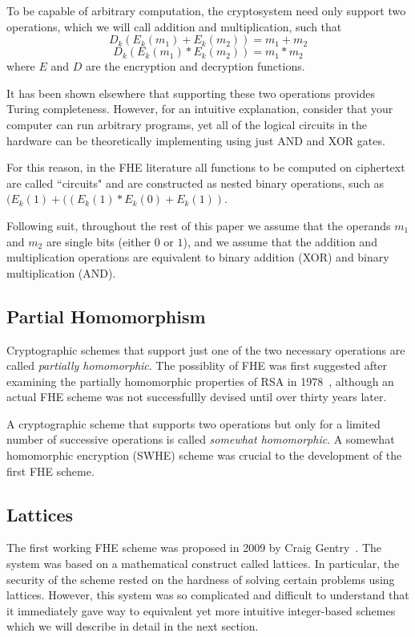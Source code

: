 \documentclass[letterpaper,twocolumn,10pt]{article}
\begin{document}
To be capable of arbitrary computation, the cryptosystem need only support two operations, which we will call addition and multiplication, such that
$$D_k(E_k(m_1) + E_k(m_2)) = m_1 + m_2$$
$$D_k(E_k(m_1) * E_k(m_2)) = m_1 * m_2$$
where $E$ and $D$ are the encryption and decryption functions.

It has been shown elsewhere that supporting these two operations provides Turing completeness. However, for an intuitive explanation, consider that your computer can run arbitrary programs, yet all of the logical circuits in the hardware can be theoretically implementing using just AND and XOR gates. 

For this reason, in the FHE literature all functions to be computed on ciphertext are called ``circuits" and are constructed as nested binary operations, such as $(E_k(1)+((E_k(1)*E_k(0)+E_k(1))$.

Following suit, throughout the rest of this paper we assume that the operands $m_1$ and $m_2$ are single bits (either $0$ or $1$), and we assume that the addition and multiplication operations are equivalent to binary addition (XOR) and binary multiplication (AND).

\subsection{Partial Homomorphism}
Cryptographic schemes that support just one of the two necessary operations are called \emph{partially homomorphic}. The possiblity of FHE was first suggested after examining the partially homomorphic properties of RSA in 1978~\cite{Rivest}, although an actual FHE scheme was not successfullly devised until over thirty years later.

A cryptographic scheme that supports two operations but only for a limited number of successive operations is called \emph{somewhat homomorphic}. A somewhat homomorphic encryption (SWHE) scheme was crucial to the development of the first FHE scheme.

\subsection{Lattices}
The first working FHE scheme was proposed in 2009 by Craig Gentry~\cite{GentryThesis09, GentrySTOC09}. The system was based on a mathematical construct called lattices. In particular, the security of the scheme rested on the hardness of solving certain problems using lattices. However, this system was so complicated and difficult to understand that it immediately gave way to equivalent yet more intuitive integer-based schemes~\cite{SmartVercauteren, DGHV} which we will describe in detail in the next section.
\end{document}
